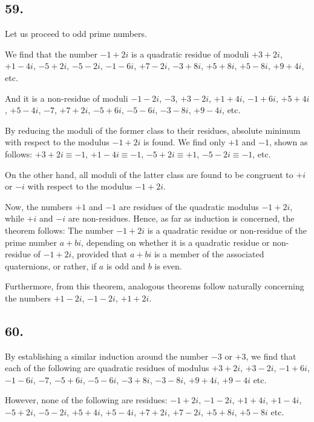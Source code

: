 \documentclass[twoside,12pt, showframe]{memoir}
\begin{document}
\subsection*{59.}
Let us proceed to odd prime numbers.

We find that the number \(-1+2 i\) is a quadratic residue of moduli \(+3+2 i\), \(+1-4 i\), \(-5+2 i\), \(-5-2 i\), \(-1-6 i\), \(+7-2 i\), \(-3+8 i\), \(+5+8 i\), \(+5-8 i\), \(+9+4 i\), etc.

And it is a non-residue of moduli \(-1-2 i\), \(-3\), \(+3-2 i\), \(+1+4 i\), \(-1+6 i\), \(+5+4 i\), \(+5-4 i\), \(-7\), \(+7+2 i\), \(-5+6 i\), \(-5-6 i\), \(-3-8 i\), \(+9-4 i\), etc.

By reducing the moduli of the former class to their residues, absolute minimum with respect to the modulus \(-1+2 i\) is found. We find only \(+1\) and \(-1\), shown as follows: \(+3+2 i \equiv -1\), \(+1-4 i \equiv -1\), \(-5+2 i \equiv +1\), \(-5-2 i \equiv -1\), etc.

On the other hand, all moduli of the latter class are found to be congruent to \(+i\) or \(-i\) with respect to the modulus \(-1+2 i\).

Now, the numbers \(+1\) and \(-1\) are residues of the quadratic modulus \(-1+2 i\), while \(+i\) and \(-i\) are non-residues. Hence, as far as induction is concerned, the theorem follows: The number \(-1+2 i\) is a quadratic residue or non-residue of the prime number \(a+b i\), depending on whether it is a quadratic residue or non-residue of \(-1+2 i\), provided that \(a+b i\) is a member of the associated quaternions, or rather, if \(a\) is odd and \(b\) is even.

Furthermore, from this theorem, analogous theorems follow naturally concerning the numbers \(+1-2 i\), \(-1-2 i\), \(+1+2 i\).
%

\subsection*{60.}

By establishing a similar induction around the number \(-3\) or \(+3\), we find that each of the following are quadratic residues of modulus \(+3+2 i\), \(+3-2 i\), \(-1+6 i\), \(-1-6 i\), \(-7\), \(-5+6 i\), \(-5-6 i\), \(-3+8 i\), \(-3-8 i\), \(+9+4 i\), \(+9-4 i\) etc.

However, none of the following are residues: \(-1+2 i\), \(-1-2 i\), \(+1+4 i\), \(+1-4 i\), \(-5+2 i\), \(-5-2 i\), \(+5+4 i\), \(+5-4 i\), \(+7+2 i\), \(+7-2 i\), \(+5+8 i\), \(+5-8 i\) etc.
\end{document}
